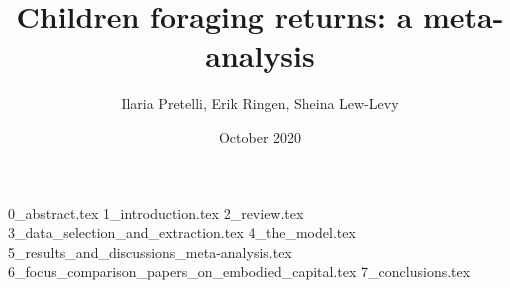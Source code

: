 \documentclass{article}
\title{Children foraging returns: a meta-analysis}
\author{Ilaria Pretelli, Erik Ringen, Sheina Lew-Levy}
\date{October 2020}
\begin{document}
\maketitle
\linenumbers


{0_abstract.tex}
{1_introduction.tex}
{2_review.tex}
{3_data_selection_and_extraction.tex}
{4_the_model.tex}
{5_results_and_discussions_meta-analysis.tex}
{6_focus_comparison_papers_on_embodied_capital.tex}
{7_conclusions.tex}




\end{document}
